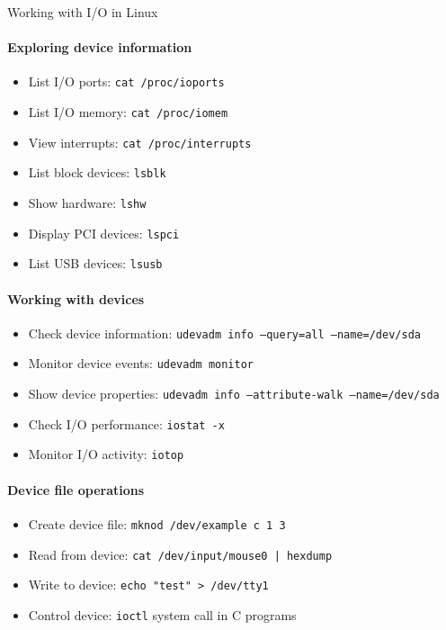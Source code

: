 \begin{KR}{Working with I/O in Linux}\\
    \paragraph{Exploring device information}
    \begin{itemize}
        \item List I/O ports: \texttt{cat /proc/ioports}
        \item List I/O memory: \texttt{cat /proc/iomem}
        \item View interrupts: \texttt{cat /proc/interrupts}
        \item List block devices: \texttt{lsblk}
        \item Show hardware: \texttt{lshw}
        \item Display PCI devices: \texttt{lspci}
        \item List USB devices: \texttt{lsusb}
    \end{itemize}
    
    \paragraph{Working with devices}
    \begin{itemize}
        \item Check device information: \texttt{udevadm info --query=all --name=/dev/sda}
        \item Monitor device events: \texttt{udevadm monitor}
        \item Show device properties: \texttt{udevadm info --attribute-walk --name=/dev/sda}
        \item Check I/O performance: \texttt{iostat -x}
        \item Monitor I/O activity: \texttt{iotop}
    \end{itemize}
    
    \paragraph{Device file operations}
    \begin{itemize}
        \item Create device file: \texttt{mknod /dev/example c 1 3}
        \item Read from device: \texttt{cat /dev/input/mouse0 | hexdump}
        \item Write to device: \texttt{echo "test" > /dev/tty1}
        \item Control device: \texttt{ioctl} system call in C programs
    \end{itemize}
\end{KR}

